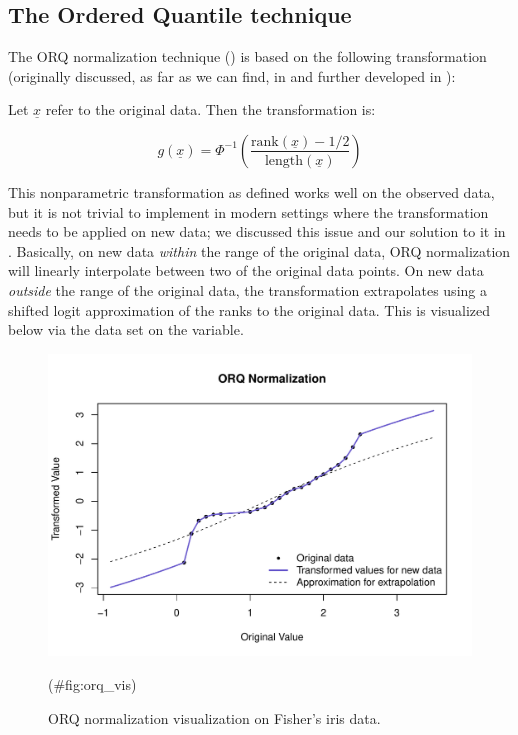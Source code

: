 \hypertarget{the-ordered-quantile-technique}{%
\subsection{The Ordered Quantile
technique}\label{the-ordered-quantile-technique}}

The ORQ normalization technique () is based on the
following transformation (originally discussed, as far as we can find,
in \citet{bartlett1947} and further developed in \citet{van1952}):

Let \(\underline x\) refer to the original data. Then the transformation
is:

\[
g(\underline x) = \Phi ^{-1} \left(\frac{\text{rank} (\underline x) - 1/2}{\text{length}(\underline x) }\right)
\]

This nonparametric transformation as defined works well on the observed
data, but it is not trivial to implement in modern settings where the
transformation needs to be applied on new data; we discussed this issue
and our solution to it in \citet{orq_paper}. Basically, on new data
\emph{within} the range of the original data, ORQ normalization will
linearly interpolate between two of the original data points. On new
data \emph{outside} the range of the original data, the transformation
extrapolates using a shifted logit approximation of the ranks to the
original data. This is visualized below via the  data set on
the  variable.

\begin{Schunk}
\begin{figure}

{\centering \includegraphics[width=1\linewidth]{figs/orq_vis-1} 

}

\caption[ORQ normalization visualization on Fisher's iris data]{ORQ normalization visualization on Fisher's iris data.}(\#fig:orq_vis)
\end{figure}
\end{Schunk}

